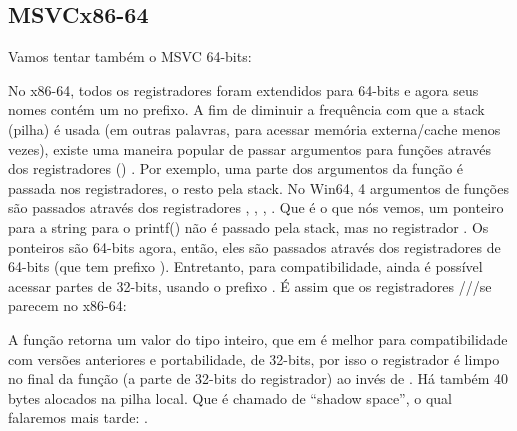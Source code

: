 \subsection{MSVC\EMDASH{}x86-64}

Vamos tentar também o MSVC 64-bits:




No x86-64, todos os registradores foram extendidos para 64-bits e agora seus nomes contém um  no prefixo.
A fim de diminuir a frequência com que a stack (pilha) é usada (em outras palavras, para acessar memória externa/cache menos vezes),
existe uma maneira popular de passar argumentos para funções através dos registradores ()
\ifx\LITE\undefined {} \fi
.
Por exemplo, uma parte dos argumentos da função é passada nos registradores, o resto pela stack.
No Win64, 4 argumentos de funções são passados através dos registradores \RCX, \RDX, , .
Que é o que nós vemos, um ponteiro para a string para o printf() não é passado pela stack, mas no registrador \RCX.
Os ponteiros são 64-bits agora, então, eles são passados através dos registradores de 64-bits (que tem prefixo ).
Entretanto, para compatibilidade, ainda é possível acessar partes de 32-bits, usando o prefixo .
É assim que os registradores \RAX/\EAX/\AX/\AL se parecem no x86-64:


A função \main retorna um valor do tipo inteiro, que em \CCpp é melhor para compatibilidade com versões anteriores e portabilidade,
de 32-bits, por isso o registrador \EAX é limpo no final da função (a parte de 32-bits do registrador) ao invés de \RAX.
Há também 40 bytes alocados na pilha local.
Que é chamado de ``shadow space'', o qual falaremos mais tarde: .


